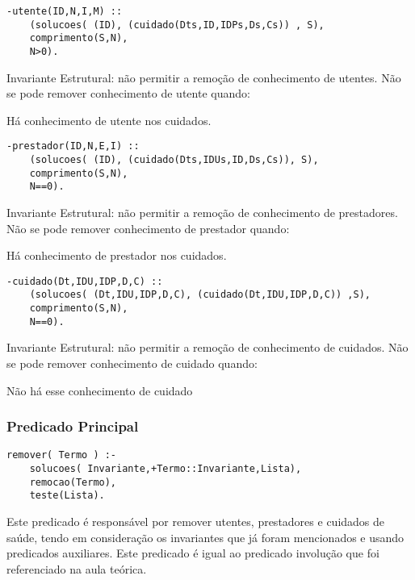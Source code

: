 \documentclass[a4paper]{report} %
\begin{document}
\begin{verbatim}
-utente(ID,N,I,M) :: 
    (solucoes( (ID), (cuidado(Dts,ID,IDPs,Ds,Cs)) , S),
    comprimento(S,N),
    N>0).
\end{verbatim}

Invariante Estrutural: não permitir a remoção de conhecimento de utentes. Não se pode remover conhecimento de utente quando:
\begin{arrowlist}
\item Há conhecimento de utente nos cuidados.
\end{arrowlist}

\begin{verbatim}
-prestador(ID,N,E,I) :: 
    (solucoes( (ID), (cuidado(Dts,IDUs,ID,Ds,Cs)), S),
    comprimento(S,N),
    N==0).
\end{verbatim}

Invariante Estrutural: não permitir a remoção de conhecimento de prestadores. Não se pode remover conhecimento de prestador quando:
\begin{arrowlist}
\item Há conhecimento de prestador nos cuidados.
\end{arrowlist}

\begin{verbatim}
-cuidado(Dt,IDU,IDP,D,C) :: 
    (solucoes( (Dt,IDU,IDP,D,C), (cuidado(Dt,IDU,IDP,D,C)) ,S),
    comprimento(S,N), 
    N==0).
\end{verbatim}
Invariante Estrutural:  não permitir a remoção de conhecimento de cuidados. Não se pode remover conhecimento de cuidado quando:
\begin{arrowlist}
\item Não há esse conhecimento de cuidado
\end{arrowlist}

\subsubsection{Predicado Principal}

\begin{verbatim}
remover( Termo ) :-
    solucoes( Invariante,+Termo::Invariante,Lista), 
    remocao(Termo), 
    teste(Lista).
\end{verbatim}

Este predicado é responsável por remover utentes, prestadores e cuidados de saúde, tendo em consideração os invariantes que já foram mencionados e usando predicados auxiliares. Este predicado é igual ao predicado involução que foi referenciado na aula teórica.
\end{document}
